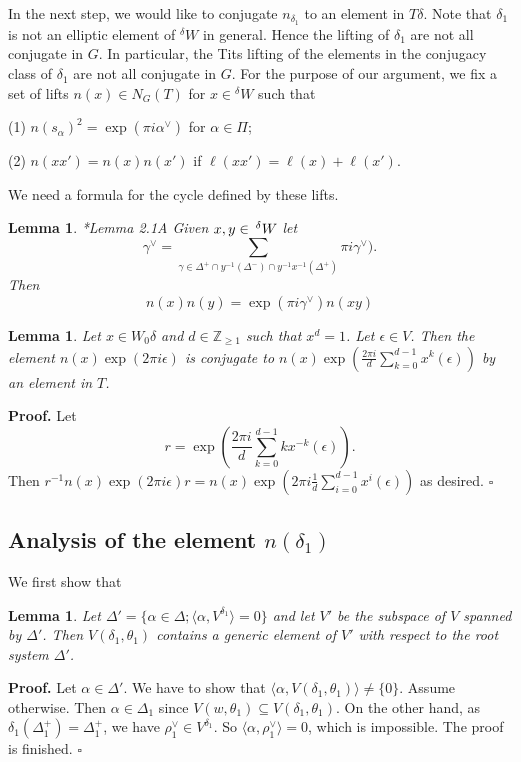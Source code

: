 \documentclass[12pt,leqno]{article}
\newtheorem{lemma}[equation]{Lemma}
\newcommand{\qed}{\hfill $\square$ \medskip}
\newenvironment{proof}[1][Proof]{\noindent\textbf{#1.} }{\qed}
\renewcommand{\a}{\mathfrak a}
\newcommand{\g}{\mathfrak g}
\newcommand{\Wext}{\negthinspace\negthinspace\phantom{a}^\delta W}
\def\ge{\geqslant}
\def\a{\alpha}
\def\g{\gamma}
\def\d{\delta}
\def\D{\Delta}
\def\e{\epsilon}
\def\th{\theta}
\def\i{^{-1}}
\begin{document}
In the next step, we would like to conjugate $n_{\d_1}$ to an element in $T \d$. Note that $\d_1$ is not an elliptic element of ${}^\d W$ in general.
Hence the lifting of $\d_1$ are not all conjugate in $G$. In particular, the Tits lifting of the elements in the conjugacy class of $\d_1$ are not all conjugate in $G$. For the purpose of our argument, we fix a set of lifts $n(x) \in N_G(T)$ for $x \in {}^\d W$ such that

(1) $n(s_\a)^2=\exp(\pi i \a^\vee)$ for $\a \in \Pi$;

(2) $n(x x') = n(x) n(x')$ if $\ell(x x') = \ell(x) + \ell(x')$.

We need a formula for the cycle defined by these lifts.

\begin{lemma} \label{factor}{\cite{ls}*{Lemma 2.1A}}
Given $x,y\in \Wext$ let 
$$
\gamma^\vee=\sum_{\g \in \D^+ \cap y \i(\D^-) \cap y \i x \i (\D^+)} \pi i \g^\vee).
$$
Then 
$$
n(x)n(y)=\exp(\pi i\gamma^\vee)n(xy)
$$
\end{lemma}


\begin{lemma} \label{average}
	Let $x \in W_0 \d$ and  $d \in \mathbb Z_{\ge 1}$ such that $x^d=1$. Let $\e \in V$. Then the element $n(x) \exp(2 \pi i \e)$ is conjugate to $n(x) \exp(\frac{2 \pi i}{d}\sum_{k=0}^{d-1} x^k(\e))$ by an element in $T$.
\end{lemma}
\begin{proof}
	Let $$r=\exp(\frac{2\pi i }{d}\sum_{k=0}^{d-1} k x^{-k}(\e)).$$ Then $r^{-1} n(x) \exp(2 \pi i \e) r = n(x) \exp(2\pi i\frac{1}{d}\sum_{i=0}^{d-1} x^i(\e))$ as desired.
\end{proof}

\subsection{Analysis of the element $n(\d_1)$}

We first show that

\begin{lemma}
	Let $\D'=\{\a \in \D; \langle\a, V^{\d_1}\rangle=0\}$ and let $V'$ be the subspace of $V$ spanned by $\D'$. Then $V(\d_1, \th_1)$ contains a generic element of $V'$ with respect to the root system $\D'$.
\end{lemma}
\begin{proof}
	Let $\a \in \D'$. We have to show that $\langle\a, V(\d_1, \th_1)\rangle \neq \{0\}$. Assume otherwise. Then $\a \in \D_1$ since $V(w, \th_1) \subseteq V(\d_1, \th_1)$. On the other hand, as $\d_1(\D_1^+) = \D_1^+$, we have $\rho_1^\vee \in V^{\d_1}$. So $\langle\a, \rho_1^\vee \rangle = 0$, which is impossible. The proof is finished.
\end{proof}
\end{document}
